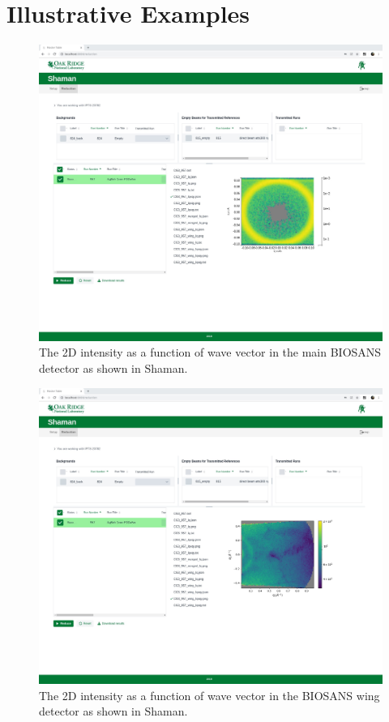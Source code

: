 \section{Illustrative Examples}
\label{}

\begin{figure}[htbp]
\centering
\includegraphics[width=\textwidth]{shaman-paper-2019/src/figures/biosans-IQXY.jpg}
\caption{The 2D intensity as a function of wave vector in the main BIOSANS detector as shown in Shaman.}
\label{biosans-main}
\end{figure}

\begin{figure}[htbp]
\centering
\includegraphics[width=\textwidth]{shaman-paper-2019/src/figures/biosans-IQ-wing.jpg}
\caption{The 2D intensity as a function of wave vector in the BIOSANS wing detector as shown in Shaman.}
\label{biosans-wing}
\end{figure}


